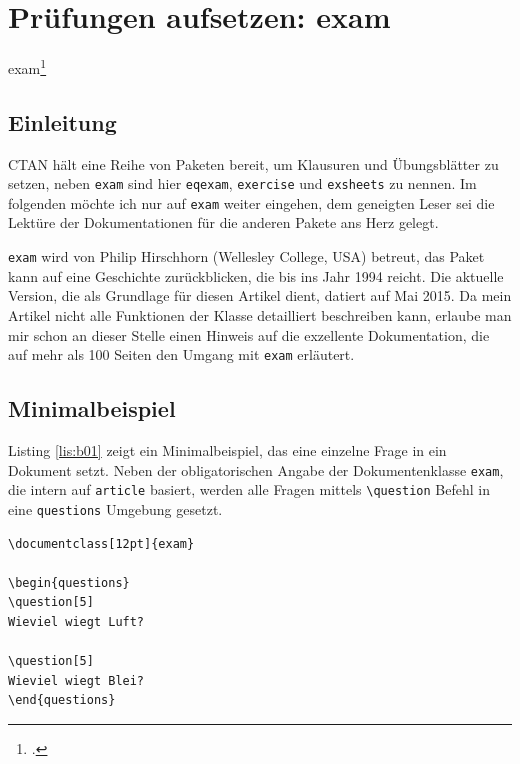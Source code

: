 \chapter{Prüfungen aufsetzen: exam}

exam\footcite{ziegenhagen:dtk2016/2}



\section{Einleitung}

CTAN hält eine Reihe von Paketen bereit, um Klausuren und Übungsblätter zu setzen, neben \texttt{exam} sind hier \texttt{eqexam}, \texttt{exercise} und \texttt{exsheets} zu nennen. Im folgenden möchte ich nur auf \texttt{exam} weiter eingehen, dem geneigten Leser sei die Lektüre der Dokumentationen für die anderen Pakete ans Herz gelegt.

\texttt{exam} wird von Philip Hirschhorn (Wellesley College, USA) betreut, das Paket kann auf eine Geschichte zurückblicken, die bis ins Jahr 1994 reicht. Die aktuelle Version, die als Grundlage für diesen Artikel dient, datiert auf Mai 2015. Da mein Artikel nicht alle Funktionen der Klasse detailliert beschreiben kann, erlaube man mir schon an dieser Stelle einen Hinweis auf die exzellente Dokumentation, die auf mehr als 100 Seiten den Umgang mit \texttt{exam} erläutert.

\section{Minimalbeispiel}

Listing \ref{lis:b01} zeigt ein Minimalbeispiel, das eine einzelne Frage in ein Dokument setzt. Neben der obligatorischen Angabe der Dokumentenklasse \texttt{exam}, die intern auf \texttt{article} basiert, werden alle Fragen mittels \texttt{\textbackslash question} Befehl in eine \texttt{questions} Umgebung gesetzt. 

\begin{lstlisting}[caption={Minimalbeispiel \texttt{beispiel-01.tex}},label={lis:b01}]
\documentclass[12pt]{exam}

\begin{questions}
\question[5]
Wieviel wiegt Luft?

\question[5]
Wieviel wiegt Blei?
\end{questions}

\end{lstlisting}

